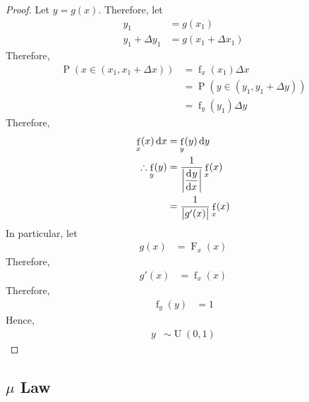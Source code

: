 \documentclass[titlepage, fleqn, a4paper, 12pt, twoside]{article}
\theoremstyle{definition}
\theoremstyle{theorem}
\DeclareMathOperator{\cdf}{\mathrm{F}}
\DeclareMathOperator{\pdf}{\mathrm{f}}
\DeclareMathOperator{\prob}{\mathrm{P}}
\DeclareMathOperator{\uniform}{\mathrm{U}}
\begin{document}
\begin{proof}
	Let $y = g(x)$.
	Therefore, let
	\begin{align*}
		y_1 &= g(x_1)\\
		y_1 + \Delta y_1 &= g(x_1 + \Delta x_1)
	\end{align*}
	Therefore,
	\begin{align*}
		\prob\left( x \in (x_1, x_1 + \Delta x) \right) &= \pdf_x(x_1) \Delta x\\
		&= \prob\left( y \in (y_1, y_1 + \Delta y) \right)\\
		&= \pdf_y(y_1) \Delta y
	\end{align*}
	Therefore,
	\begin{align*}
		\pdf_x(x) \dif x &= \pdf_y(y) \dif y\\
		\therefore \pdf_y(y) &= \frac{1}{\left| \dod{y}{x} \right|} \pdf_x(x)\\
		&= \frac{1}{\left| g'(x) \right|} \pdf_x(x)
	\end{align*}
	In particular, let
	\begin{align*}
		g(x) &= \cdf_x(x)
	\end{align*}
	Therefore,
	\begin{align*}
		g'(x) &= \pdf_x(x)
	\end{align*}
	Therefore,
	\begin{align*}
		\pdf_y(y) &= 1
	\end{align*}
	Hence,
	\begin{align*}
		y &\sim \uniform(0,1)
	\end{align*}
\end{proof}

\subsection{$\mu$ Law}
\end{document}
